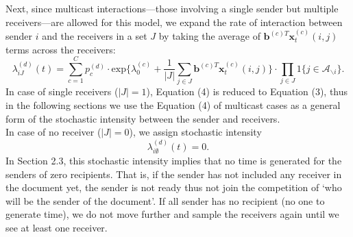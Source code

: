 \documentclass[a4paper]{article}
\begin{document}
Next, since multicast interactions—those involving a single sender but multiple
receivers—are allowed for this model, we expand the rate of interaction between sender $i$ and the receivers in a set $J$ by taking the average of $\boldsymbol{b}^{(c)T}\boldsymbol{x}^{(c)}_t(i, j)$ terms across the receivers:
\begin{equation}
\lambda^{(d)}_{iJ}(t)= \sum\limits_{c=1}^{C} p^{(d)}_c\cdot\mbox{exp}\Big\{\lambda^{(c)}_0+\frac{1}{|J|}\sum\limits_{j \in J} \boldsymbol{b}^{(c)T}\boldsymbol{x}^{(c)}_t(i, j)\Big\}\cdot \prod\limits_{j \in J}1\{j \in \mathcal{A}_{\backslash i}\}.
\end{equation}
In case of single receivers ($|J|=1$),  Equation (4) is reduced to Equation (3), thus in the following sections we use the Equation (4) of multicast cases as a general form of the stochastic intensity between the sender and receivers.\\ \newline
In case of no receiver ($|J|=0$), we assign stochastic intensity
\begin{equation}
\lambda^{(d)}_{i\emptyset}(t)= 0.
\end{equation}
In Section 2.3, this stochastic intensity implies that no time is generated for the senders of zero recipients. That is, if the sender has not included any receiver in the document yet, the sender is not ready thus not join the competition of `who will be the sender of the document'. If all sender has no recipient (no one to generate time), we do not move further and sample the receivers again until we see at least one receiver.  
\end{document}
